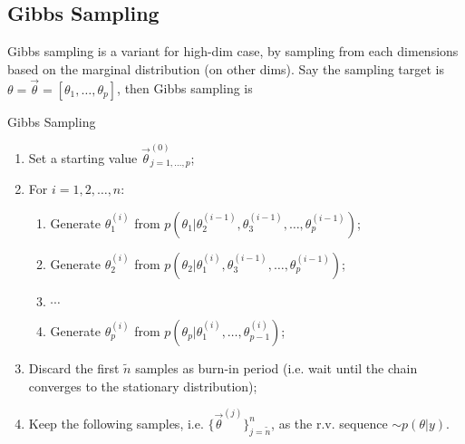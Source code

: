     





\subsection{Gibbs Sampling}\label{SubSubSectionBayesianGibbs}

Gibbs sampling is a variant for high-dim case, by sampling from each dimensions based on the marginal distribution (on other dims). Say the sampling target is $ \theta =\vec{\theta }=[\theta _1,\ldots,\theta _p] $, then Gibbs sampling is 

\begin{algorithm}{Gibbs Sampling}
    \begin{enumerate}[topsep=2pt,itemsep=0pt]
        \item Set a starting value $ \vec{\theta }^{(0)}_{j=1,\ldots,p} $;
        \item For $ i=1,2,\ldots,n $:
        \begin{enumerate}[topsep=2pt,itemsep=2pt]
            \item Generate $ \theta _1^{(i)} $ from $ p(\theta _1|\theta _2^{(i-1)},\theta _3^{(i-1)},\ldots,\theta _p^{(i-1)}) $;
            \item Generate $ \theta _2^{(i)} $ from $ p(\theta _2|\theta _1^{(i)},\theta _3^{(i-1)},\ldots,\theta _p^{(i-1)}) $;
            \item $ \cdots $
            \item Generate $ \theta _p^{(i)} $ from $ p(\theta _p|\theta _1^{(i)},\ldots,\theta _{p-1}^{(i)}) $;
        \end{enumerate}
        \item Discard the first $ \tilde{n} $ samples as burn-in period (i.e. wait until the chain converges to the stationary distribution);
        \item Keep the following samples, i.e. $ \{\vec{\theta }^{(j)}\}_{j=\tilde{n}}^n $, as the r.v. sequence $ \sim p(\theta |y) $.
    \end{enumerate}
\end{algorithm}

